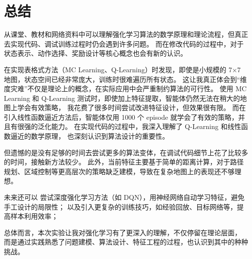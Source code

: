 \section{总结}

从课堂、教材和网络资料中可以理解强化学习算法的数学原理和理论流程，但真正去实现代码、调试训练过程时仍会遇到许多问题。
而在修改代码的过程中，对于状态表示、动作选择、奖励设计等核心概念也会有新的认识。


在实现表格式方法（MC Learning、Q-Learning）时发现，即使是小规模的 7×7 地图，状态空间已经非常庞大，训练时很难遍历所有状态。
这让我真正体会到“维度灾难”不仅是理论上的概念，在实际应用中会严重制约算法的可行性。
使用 MC Learning 和 Q-Learning 测试时，即使加上特征提取，智能体仍然无法在稍大的地图上学会有效策略，
我花费了很多时间尝试改进特征设计，但效果很有限。
而在引入线性函数逼近方法后，智能体仅用 1000 个 episode 就学会了有效的策略，并且有很强的泛化能力。
在实现代码的过程中，我深入理解了 Q-Learning 和线性函数逼近的数学原理，
也深刻认识到算法设计的重要性。

但遗憾的是没有足够的时间去尝试更多的算法变体，在调试代码细节上花了比较多的时间，接触新方法较少。
此外，当前特征主要基于简单的距离计算，对于路径规划、区域控制等更高层次的策略缺乏建模，导致在复杂地图上的表现还不够理想。

未来还可以
尝试深度强化学习方法（如 DQN），用神经网络自动学习特征，避免手工设计的局限性；
以及引入更复杂的训练技巧，如经验回放、目标网络等，提高样本利用效率；

总体而言，本次实验让我对强化学习有了更深入的理解，不仅停留在理论层面，
而是通过实践熟悉了问题建模、算法设计、特征工程的过程，也认识到其中的种种挑战。